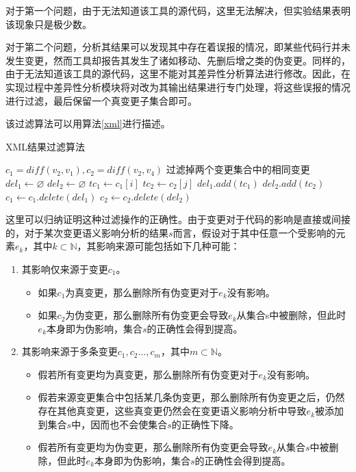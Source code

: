 对于第一个问题，由于无法知道该工具的源代码，这里无法解决，但实验结果表明该现象只是极少数。

对于第二个问题，分析其结果可以发现其中存在着误报的情况，即某些代码行并未发生变更，然而工具却报告其发生了诸如移动、先删后增之类的伪变更。同样的，由于无法知道该工具的源代码，这里不能对其差异性分析算法进行修改。因此，在实现过程中差异性分析模块将对改为其输出结果进行专门处理，将这些误报的情况进行过滤，最后保留一个真变更子集合即可。

该过滤算法可以用算法\ref {xml}进行描述。

\begin{algorithm}
	\caption{XML结果过滤算法}
	\label{xml}
	\begin{algorithmic}[1]
		\Require $c_1 = diff(v_2, v_1), c_2 = diff(v_2,v_4)$
		\Ensure 过滤掉两个变更集合中的相同变更
		\State $del_1 \gets \varnothing$
		\State $del_2 \gets \varnothing$
		\State $tc_1 \gets c_1[i]$
		\State $tc_2 \gets c_2[j]$
		\State $del_1.add(tc_1)$
		\State $del_2.add(tc_2)$
		\EndIf	
		\EndFor
		\EndFor
		\State $c_1 \gets c_1.delete(del_1)$
		\State $c_2 \gets c_2.delete(del_2)$
	\end{algorithmic}
\end{algorithm}

这里可以归纳证明这种过滤操作的正确性。由于变更对于代码的影响是直接或间接的，对于某次变更语义影响分析的结果$s$而言，假设对于其中任意一个受影响的元素$e_k$，其中$k \subset \mathbb{N}$，其影响来源可能包括如下几种可能：
\begin{enumerate}
	\item 其影响仅来源于变更$c_1$。
	\begin{itemize}
		\item 如果$c_1$为真变更，那么删除所有伪变更对于$e_k$没有影响。
		\item 如果$c_2$为伪变更，那么删除所有伪变更会导致$e_k$从集合s中被删除，但此时$e_k$本身即为伪影响，集合$s$的正确性会得到提高。
	\end{itemize}
	\item 其影响来源于多条变更$c_1,c_2\dots,c_m$，其中$m \subset \mathbb{N}$。
	\begin{itemize}
		\item 假若所有变更均为真变更，那么删除所有伪变更对于$e_k$没有影响。
		\item 假若来源变更集合中包括某几条伪变更，那么删除所有伪变更之后，仍然存在其他真变更，这些真变更仍然会在变更语义影响分析中导致$e_k$被添加到集合$s$中，因而也不会使集合$s$的正确性下降。
		\item 假若所有变更均为伪变更，那么删除所有伪变更会导致$e_k$从集合$s$中被删除，但此时$e_k$本身即为伪影响，集合$s$的正确性会得到提高。
	\end{itemize}
\end{enumerate}

